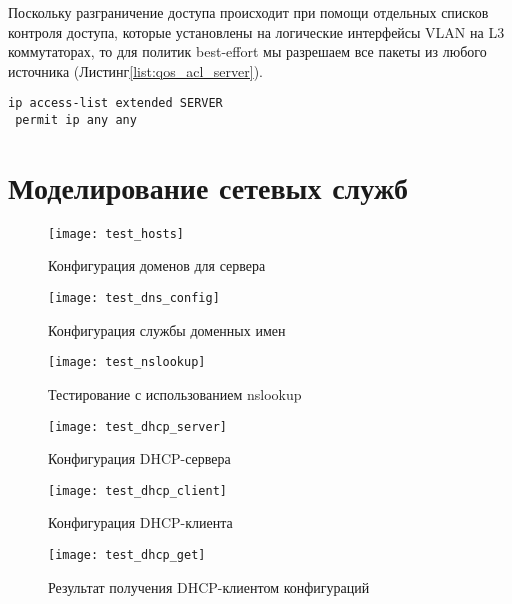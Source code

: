 \documentclass[14pt, a4paper]{extarticle}
\begin{document}
\begin{appendices}
Поскольку разграничение доступа происходит при помощи отдельных списков контроля доступа, которые установлены на логические интерфейсы VLAN на L3 коммутаторах, то для политик best-effort мы разрешаем все пакеты из любого источника (Листинг\;\ref{list:qos_acl_server}).

\begin{lstlisting}[caption=Список контроля доступа для службы динамического конфигурирования хостов\label{list:qos_acl_server}]
ip access-list extended SERVER
 permit ip any any
\end{lstlisting}

\section{Моделирование сетевых служб}
\label{apx:virtualbox}

\begin{figure}[H]
  \centering
  \texttt{[image: test\_hosts]}
  \caption{Конфигурация доменов для сервера}
  \label{fig:test_hosts}
\end{figure}

\begin{figure}[H]
  \centering
  \texttt{[image: test\_dns\_config]}
  \caption{Конфигурация службы доменных имен}
  \label{fig:test_dns_config}
\end{figure}

\begin{figure}[H]
  \centering
  \texttt{[image: test\_nslookup]}
  \caption{Тестирование с использованием nslookup}
  \label{fig:test_nslookup}
\end{figure}

\begin{figure}[H]
  \centering
  \texttt{[image: test\_dhcp\_server]}
  \caption{Конфигурация DHCP-сервера}
  \label{fig:test_dhcp_server}
\end{figure}

\begin{figure}[H]
  \centering
  \texttt{[image: test\_dhcp\_client]}
  \caption{Конфигурация DHCP-клиента}
  \label{fig:test_dhcp_client}
\end{figure}

\begin{figure}[H]
  \centering
  \texttt{[image: test\_dhcp\_get]}
  \caption{Результат получения DHCP-клиентом конфигураций}
  \label{fig:test_dhcp_get}
\end{figure}


\end{appendices}
\end{document}
